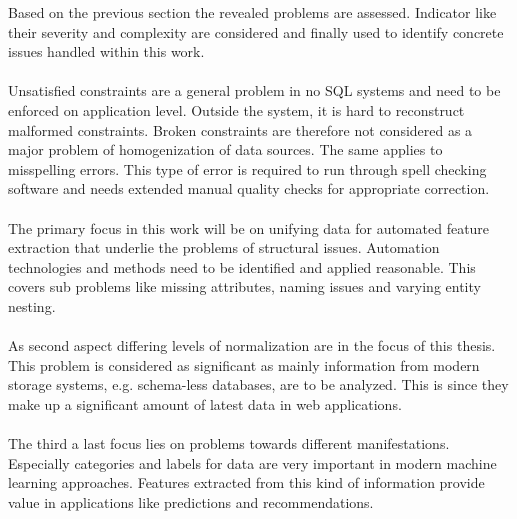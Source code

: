Based on the previous section the revealed problems are assessed. Indicator like their severity and complexity are considered and finally used to identify concrete issues handled within this work. 
\\\\
Unsatisfied constraints are a general problem in no SQL systems and need to be enforced on application level. Outside the system, it is hard to reconstruct malformed constraints. Broken constraints are therefore not considered as a major problem of homogenization of data sources. The same applies to misspelling errors. This type of error is required to run through spell checking software and needs extended manual quality checks for appropriate correction. 
\\\\
The primary focus in this work will be on unifying data for automated feature extraction that underlie the problems of structural issues. Automation technologies and methods need to be identified and applied reasonable. This covers sub problems like missing attributes, naming issues and varying entity nesting.
\\\\
As second aspect differing levels of normalization are in the focus of this thesis. This problem is considered as significant as mainly information from modern storage systems, e.g. schema-less databases, are to be analyzed. This is since they make up a significant amount of latest data in web applications.
\\\\
The third a last focus lies on problems towards different manifestations. Especially categories and labels for data are very important in modern machine learning approaches. Features extracted from this kind of information provide value in applications like predictions and recommendations.